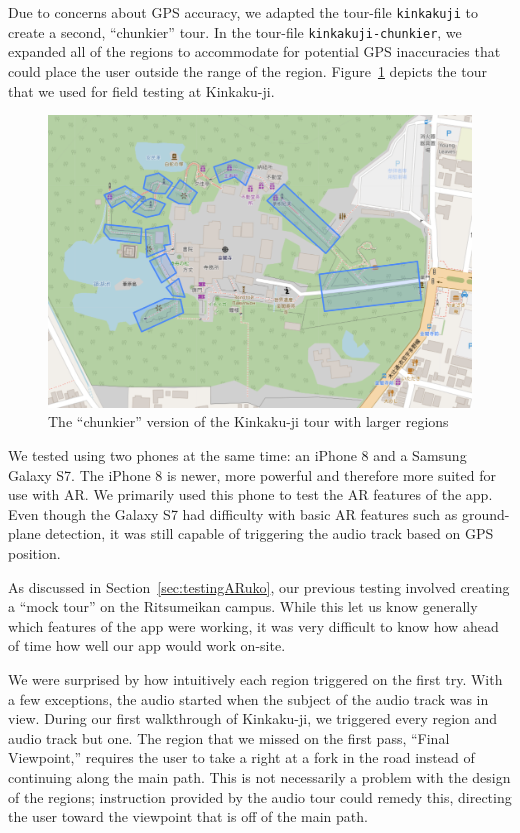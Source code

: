 \documentclass[a4paper, 10pt, american, titlepage]{article}
\begin{document}
Due to concerns about GPS accuracy, we adapted the tour-file \texttt{kinkakuji}
to create a second, ``chunkier'' tour.  In the tour-file
\texttt{kinkakuji-chunkier}, we expanded all of the regions to accommodate for
potential GPS inaccuracies that could place the user outside the range of the
region.  Figure~\ref{fig:kinkakujiChunkierTour} depicts the tour that we used
for field testing at Kinkaku-ji.

\begin{figure}[h]
	\centering
	\includegraphics[width=\textwidth]{kinkakuji-chunkier-tour.png}
	\caption[The ``chunkier'' version of the Kinkaku-ji tour]{The ``chunkier''
		version of the Kinkaku-ji tour with larger regions}
	\label{fig:kinkakujiChunkierTour}
\end{figure}

We tested using two phones at the same time: an iPhone 8 and a Samsung Galaxy
S7. The iPhone 8 is newer, more powerful and therefore more suited for use with
AR. We primarily used this phone to test the AR features of the app. Even
though the Galaxy S7 had difficulty with basic AR features such as
ground-plane detection, it was still capable of triggering the audio track
based on GPS position.

As discussed in Section~\ref{sec:testingARuko}, our previous testing involved
creating a ``mock tour'' on the Ritsumeikan campus. While this let us know
generally which features of the app were working, it was very difficult to know
how ahead of time how well our app would work on-site.

We were surprised by how intuitively each region triggered on the first try.
With a few exceptions, the audio started when the subject of the audio track
was in view. During our first walkthrough of Kinkaku-ji, we triggered every
region and audio track but one. The region that we missed on the first pass,
``Final Viewpoint,'' requires the user to take a right at a fork in the road
instead of continuing along the main path. This is not necessarily a problem
with the design of the regions; instruction provided by the audio tour could
remedy this, directing the user toward the viewpoint that is off of the main
path.
\end{document}
